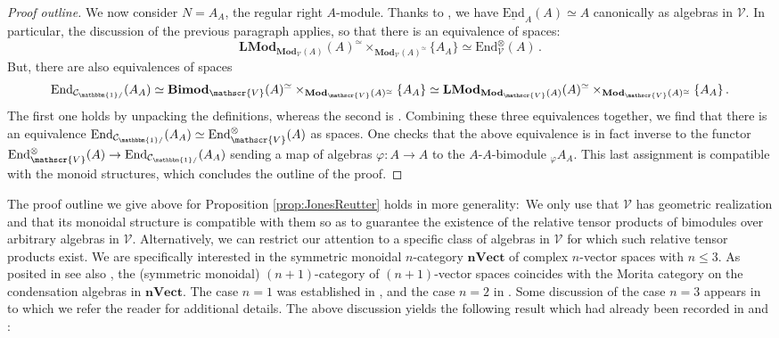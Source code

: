 \documentclass[11pt,reqno]{amsart}
\numberwithin{equation}{section}
\theoremstyle{plain}
\theoremstyle{definition}
\begin{document}
\begin{proof}[Proof outline]
We now consider $N=A_A$, the regular right $A$-module.
Thanks to \cite[Corollary 4.2.4.6]{HA}, we have $\underline{\mathrm{End}}_A(A)\simeq A$ canonically as algebras in $\mathscr{V}$.
In particular, the discussion of the previous paragraph applies, so that there is an equivalence of spaces:
$$\mathbf{LMod}_{\mathbf{Mod}_{\mathscr{V}}(A)}(A)^{\simeq}\times_{\mathbf{Mod}_{\mathscr{V}}(A)^{\simeq}}\{A_A\}\simeq\mathrm{End}_{\mathscr{V}}^{\otimes}(A)\,.$$
But, there are also equivalences of spaces
$$\mathrm{End}_{\mathcal{C}_{\mathbbm{1}/}}(A_A)\simeq \mathbf{Bimod}_{\mathscr{V}}(A)^{\simeq}\times_{\mathbf{Mod}_{\mathscr{V}}(A)^{\simeq}}\{A_A\}\simeq \mathbf{LMod}_{\mathbf{Mod}_{\mathscr{V}}(A)}(A)^{\simeq}\times_{\mathbf{Mod}_{\mathscr{V}}(A)^{\simeq}}\{A_A\}\,.$$
The first one holds by unpacking the definitions, whereas the second is \cite[Theorem 4.3.2.7]{HA}.
Combining these three equivalences together, we find that there is an equivalence $\mathrm{End}_{\mathcal{C}_{\mathbbm{1}/}}(A_A)\simeq\mathrm{End}^{\otimes}_{\mathscr{V}}(A)$ as spaces.
One checks that the above equivalence is in fact inverse to the functor $\mathrm{End}_{\mathscr{V}}^{\otimes}(A)\rightarrow\mathrm{End}_{\mathcal{C}_{\mathbbm{1}/}}(A_A)$ sending a map of algebras $\varphi:A\rightarrow A$ to the $A$-$A$-bimodule $_{\varphi}A_A$.
This last assignment is compatible with the monoid structures, which concludes the outline of the proof.
\end{proof}

The proof outline we give above for Proposition \ref{prop:JonesReutter} holds in more generality:\
We only use that $\mathscr{V}$ has geometric realization and that its monoidal structure is compatible with them so as to guarantee the existence of the relative tensor products of bimodules over arbitrary algebras in $\mathscr{V}$.
Alternatively, we can restrict our attention to a specific class of algebras in $\mathscr{V}$ for which such relative tensor products exist.
We are specifically interested in the symmetric monoidal $n$-category $\mathbf{nVect}$ of complex $n$-vector spaces with $n\leq 3$.
As posited in \cite{Gaiotto:2019xmp} see also \cite[Section II]{JF}, the (symmetric monoidal) $(n+1)$-category of $(n+1)$-vector spaces coincides with the Morita category on the condensation algebras in $\mathbf{nVect}$.
The case $n=1$ was established in \cite{D1}, and the case $n=2$ in \cite{D8}. Some discussion of the case $n=3$ appears in \cite{Bhardwaj:2024xcx} to which we refer the reader for additional details.
The above discussion yields the following result which had already been recorded in \cite[Theorem 5.2.24]{Bhardwaj:2024xcx} and \cite[Proposition 2.3.2]{JF2}:
\end{document}
